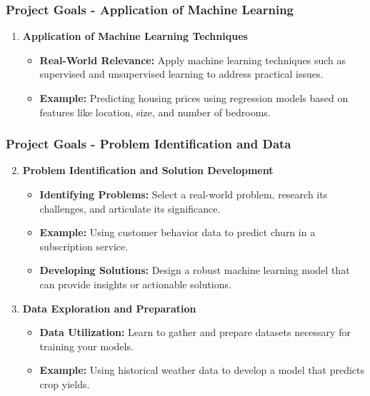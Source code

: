 \documentclass[aspectratio=169]{beamer}
\begin{document}
\begin{frame}[fragile]
    \frametitle{Project Goals - Application of Machine Learning}
    \begin{enumerate}
        \item \textbf{Application of Machine Learning Techniques}
        \begin{itemize}
            \item \textbf{Real-World Relevance:} Apply machine learning techniques such as supervised and unsupervised learning to address practical issues.
            \item \textbf{Example:} Predicting housing prices using regression models based on features like location, size, and number of bedrooms.
        \end{itemize}
    \end{enumerate}
\end{frame}

\begin{frame}[fragile]
    \frametitle{Project Goals - Problem Identification and Data}
    \begin{enumerate}
        \setcounter{enumi}{1}
        \item \textbf{Problem Identification and Solution Development}
        \begin{itemize}
            \item \textbf{Identifying Problems:} Select a real-world problem, research its challenges, and articulate its significance.
            \item \textbf{Example:} Using customer behavior data to predict churn in a subscription service.
            \item \textbf{Developing Solutions:} Design a robust machine learning model that can provide insights or actionable solutions.
        \end{itemize}

        \item \textbf{Data Exploration and Preparation}
        \begin{itemize}
            \item \textbf{Data Utilization:} Learn to gather and prepare datasets necessary for training your models.
            \item \textbf{Example:} Using historical weather data to develop a model that predicts crop yields.
        \end{itemize}
    \end{enumerate}
\end{frame}
\end{document}

